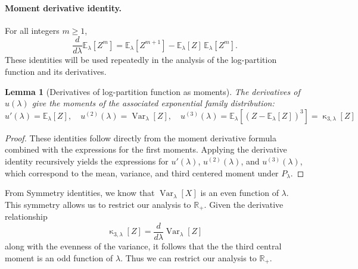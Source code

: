 \documentclass[a4paper, 10pt]{article}
\newcommand{\beq}{\begin{equation}}
\newcommand{\eeq}{\end{equation}}
\newtheorem{lemma}{Lemma}[section]
\theoremstyle{definition}
\begin{document}
\paragraph{Moment derivative identity.} For all integers \( m \geq 1 \),
    \[
    \frac{d}{d\lambda} \mathbb{E}_\lambda[Z^m] = \mathbb{E}_\lambda[Z^{m+1}] - \mathbb{E}_\lambda[Z]\,\mathbb{E}_\lambda[Z^m].
    \]
These identities will be used repeatedly in the analysis of the log-partition function and its derivatives.
\begin{lemma}[Derivatives of log-partition function as moments]\label{lem:log_partition_moments}
The derivatives of \( u(\lambda) \) give the moments of the associated exponential family distribution:
\beq
u'(\lambda) = \mathbb{E}_{\lambda}[Z], \quad u^{(2)}(\lambda) = \operatorname{Var}_{\lambda}[Z], \quad u^{(3)}(\lambda) = \mathbb{E}_{\lambda}[(Z - \mathbb{E}_{\lambda}[Z])^3] = \operatorname{\kappa}_{3,\lambda}[Z]
\eeq
\end{lemma}

\begin{proof}
These identities follow directly from the moment derivative formula combined with the expressions for the first moments. Applying the derivative identity recursively yields the expressions for \( u'(\lambda) \), \( u^{(2)}(\lambda) \), and \( u^{(3)}(\lambda) \), which correspond to the mean, variance, and third centered moment under \( P_\lambda \).
\end{proof}

From Symmetry identities, we know that  $\operatorname{Var}_{\lambda}[X]$ is an even function of $\lambda$. This symmetry allows us to restrict our analysis to $\mathbb{R}_+$. Given the derivative relationship 
 \beq \operatorname{\kappa}_{3,\lambda}[Z] = \frac{d}{d\lambda}\operatorname{Var}_{\lambda}[Z] \eeq
along with the evenness of the variance, it follows that the the third central moment is an odd function of $\lambda$. Thus we can restrict our analysis to \( \mathbb{R}_+ \).
\end{document}
